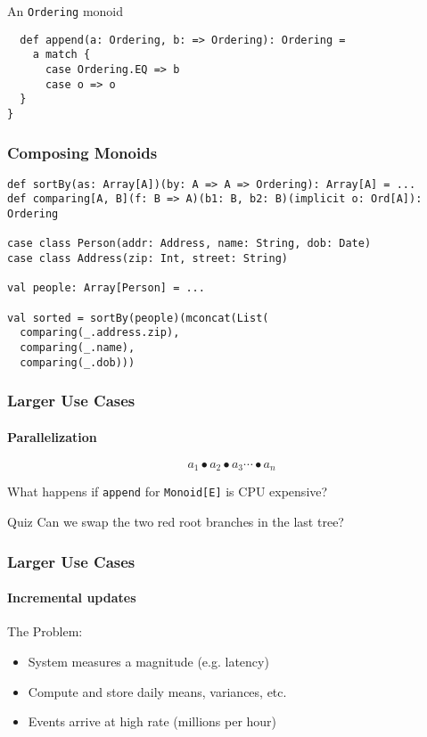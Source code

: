 \documentclass{beamer}
\begin{document}
\begin{framej}
\begin{frame}[fragile]
\begin{block}{An \texttt{Ordering} monoid}
\begin{lstlisting}
  def append(a: Ordering, b: => Ordering): Ordering =
    a match {
      case Ordering.EQ => b
      case o => o
  }
}
  \end{lstlisting}
  \end{block}
\end{frame}

\begin{frame}[fragile]
  \frametitle{Composing Monoids}
  \begin{block}{}
  \begin{lstlisting}
def sortBy(as: Array[A])(by: A => A => Ordering): Array[A] = ...
def comparing[A, B](f: B => A)(b1: B, b2: B)(implicit o: Ord[A]): Ordering

case class Person(addr: Address, name: String, dob: Date)
case class Address(zip: Int, street: String)

val people: Array[Person] = ...

val sorted = sortBy(people)(mconcat(List(
  comparing(_.address.zip),
  comparing(_.name),
  comparing(_.dob)))

  \end{lstlisting}
  \end{block}
\end{frame}

\begin{frame}
  \frametitle{Larger Use Cases}
  \framesubtitle{Parallelization}
  \[a_1 \bullet a_2 \bullet a_3 \dotsb \bullet a_n\]

  What happens if \texttt{append} for \texttt{Monoid[E]} is CPU expensive?

\pause


\begin{block}{Quiz}
  \pause
  Can we swap the two red root branches in the last tree?
\end{block}

\end{frame}

\begin{frame}
  \frametitle{Larger Use Cases}
  \framesubtitle{Incremental updates}
  The Problem:

  \begin{itemize}
    \item System measures a magnitude (e.g. latency)
    \item Compute and store daily means, variances, etc.
    \item Events arrive at high rate (millions per hour)
  \end{itemize}



\end{frame}
\end{framej}
\end{document}
